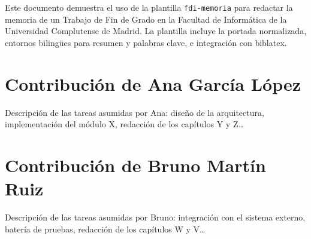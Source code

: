 \documentclass[tfg, estilo=minimo]{fdi-memoria}
\begin{document}
\makeportada

\begin{resumen}
Este documento demuestra el uso de la plantilla \texttt{fdi-memoria}
para redactar la memoria de un Trabajo de Fin de Grado en la
Facultad de Informática de la Universidad Complutense de Madrid. La
plantilla incluye la portada normalizada, entornos bilingües para
resumen y palabras clave, e integración con biblatex.
\end{resumen}

\begin{abstract}
This document demonstrates the \texttt{fdi-memoria} template for
writing the report of a Bachelor's Thesis at the Faculty of
Computer Science of the Complutense University of Madrid. The
template provides a normalized cover page, bilingual abstract and
keyword environments, and biblatex integration.
\end{abstract}

\tableofcontents






\chapter*{Contribución de Ana García López}

Descripción de las tareas asumidas por Ana: diseño de la arquitectura,
implementación del módulo X, redacción de los capítulos Y y Z\ldots

\chapter*{Contribución de Bruno Martín Ruiz}

Descripción de las tareas asumidas por Bruno: integración con el sistema
externo, batería de pruebas, redacción de los capítulos W y V\ldots

\printbibliography[heading=bibintoc]
\end{document}
